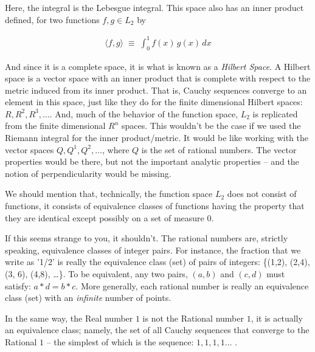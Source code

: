 \documentclass{article}
\begin{document}
Here, the integral is the Lebesgue integral. This space also has an inner 
product defined, for two functions $f, g \in L_2$ by

\begin{eqnarray}
\langle f, g \rangle \; \equiv \; \int_0^1 f(x)\, g(x)\, dx
\end{eqnarray}

And since it is a complete space, it is what is known as a {\em Hilbert Space\/}.
A Hilbert space is a vector space with an inner product that is complete with 
respect to the metric induced from its inner product. 
That is, Cauchy sequences converge to an element in this
space, just like they do for the finite dimensional Hilbert spaces: $R, R^2, R^3, \ldots$.
And, much of the behavior of the function space, $L_2$ is replicated from 
the finite dimensional $R^n$ spaces. This wouldn't be the case if we used
the Riemann integral for the inner product/metric. It would be like
working with the vector spaces $Q, Q^1, Q^2, \ldots$, where $Q$ is the set 
of rational numbers. The vector properties would be there, but not 
the important analytic properties -- and the notion of perpendicularity would
be missing.

We should mention that, technically, the function space $L_2$ does not 
consist of functions, it consists of 
equivalence classes of functions having the property
that they are identical except possibly on a set of measure $0$.

If this seems strange to you, it shouldn't. The rational numbers are, strictly 
speaking, equivalence classes of integer pairs.
For instance, the fraction that we write as '1/2' is really the 
equivalence class (set) of pairs of integers: 
\{(1,2), (2,4), (3, 6), (4,8), \ldots \}.
To be equivalent, any two pairs, $(a, b)$ and $(c, d)$ must satisfy: 
$a * d = b * c$. More generally, each rational number is really an equivalence class (set)
with an {\em infinite\/} number of points.

In the same way, the Real number $1$ is not the Rational number $1$, it is actually an equivalence 
class; namely, the set of all Cauchy sequences that converge to the Rational 
$1$ -- the simplest of which is the sequence: $1, 1, 1, 1\ldots$ .
\end{document}

